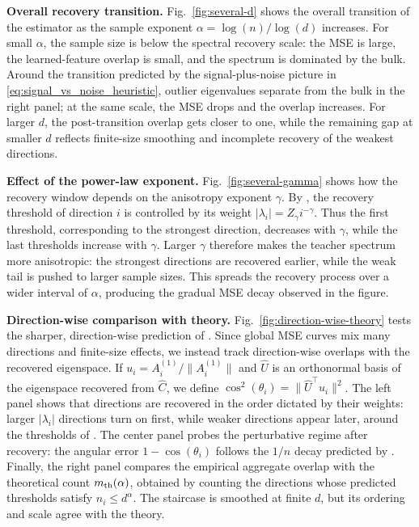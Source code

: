\documentclass[]{article}
\numberwithin{equation}{section}
\theoremstyle{definition}
\begin{document}
\textbf{Overall recovery transition.} Fig.~\ref{fig:several-d} shows the overall transition of the estimator as the sample exponent $\alpha=\log(n)/\log(d)$ increases. For small $\alpha$, the sample size is below the spectral recovery scale: the MSE is large, the learned-feature overlap is small, and the spectrum is dominated by the bulk. Around the transition predicted by the signal-plus-noise picture in \cref{eq:signal_vs_noise_heuristic}, outlier eigenvalues separate from the bulk in the right panel; at the same scale, the MSE drops and the overlap increases. For larger $d$, the post-transition overlap gets closer to one, while the remaining gap at smaller $d$ reflects finite-size smoothing and incomplete recovery of the weakest directions.

\textbf{Effect of the power-law exponent.} Fig.~\ref{fig:several-gamma} shows how the recovery window depends on the anisotropy exponent $\gamma$. By , the recovery threshold of direction $i$ is controlled by its weight $|\lambda_i|=Z_\gamma i^{-\gamma}$. Thus the first threshold, corresponding to the strongest direction, decreases with $\gamma$, while the last thresholds increase with $\gamma$. Larger $\gamma$ therefore makes the teacher spectrum more anisotropic: the strongest directions are recovered earlier, while the weak tail is pushed to larger sample sizes. This spreads the recovery process over a wider interval of $\alpha$, producing the gradual MSE decay observed in the figure.

\textbf{Direction-wise comparison with theory.} Fig.~\ref{fig:direction-wise-theory} tests the sharper, direction-wise prediction of . Since global MSE curves mix many directions and finite-size effects, we instead track direction-wise overlaps with the recovered eigenspace. If $u_i=A_i^{(1)}/\|A_i^{(1)}\|$ and $\widehat U$ is an orthonormal basis of the eigenspace recovered from $\widehat C$, we define $\cos^2(\theta_i)=\|\widehat U^\top u_i\|^2$. The left panel shows that directions are recovered in the order dictated by their weights: larger $|\lambda_i|$ directions turn on first, while weaker directions appear later, around the thresholds of . The center panel probes the perturbative regime after recovery: the angular error $1-\cos(\theta_i)$ follows the $1/n$ decay predicted by . Finally, the right panel compares the empirical aggregate overlap with the theoretical count $m_{\rm th}(\alpha)$, obtained by counting the directions whose predicted thresholds satisfy $n_i\le d^\alpha$. The staircase is smoothed at finite $d$, but its ordering and scale agree with the theory.
\end{document}
